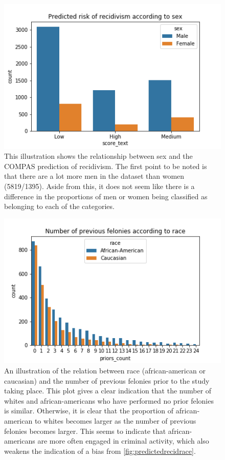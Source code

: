 \documentclass[11pt, fleqn, titlepage]{article}
\begin{document}
	\begin{figure}[H]
		\centering
		\includegraphics[width=0.5\linewidth]{imgs/predicted_recid_sex}
		\caption{This illustration shows the relationship between sex and the COMPAS prediction of recidivism. The first point to be noted is that there are a lot more men in the dataset than women (5819/1395). Aside from this, it does not seem like there is a difference in the proportions of men or women being classified as belonging to each of the categories.}
		\label{fig:predictedrecidsex}
	\end{figure}
	
	\begin{figure}[H]
		\centering
		\includegraphics[width=0.5\linewidth]{imgs/proirs}
		\caption{An illustration of the relation between race (african-american or caucasian) and the number of previous felonies prior to the study taking place. This plot gives a clear indication that the number of whites and african-americans who have performed no prior felonies is similar. Otherwise, it is clear that the proportion of african-american to whites becomes larger as the number of previous felonies becomes larger. This seems to indicate that african-americans are more often engaged in criminal activity, which also weakens the indication of a bias from \ref{fig:predictedrecidrace}.}
		\label{fig:proirs}
	\end{figure}
	
	
	
\end{document}
